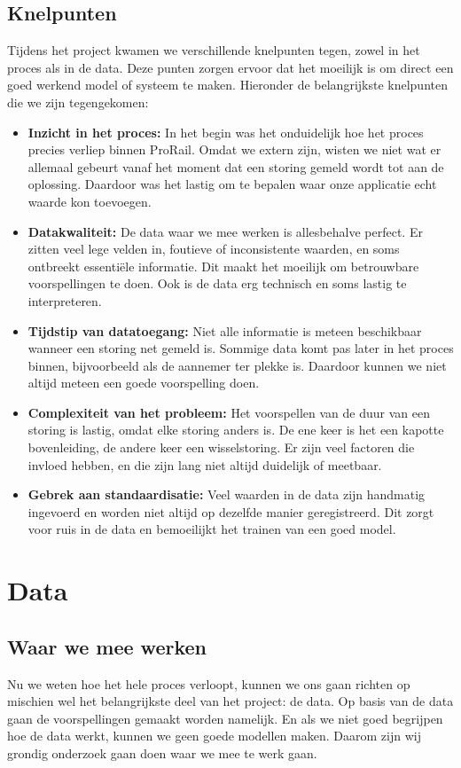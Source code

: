 \documentclass{article}
\begin{document}
\subsection{Knelpunten}
Tijdens het project kwamen we verschillende knelpunten tegen, zowel in het proces als in de data. Deze punten zorgen ervoor dat het moeilijk is om direct een goed werkend model of systeem te maken. Hieronder de belangrijkste knelpunten die we zijn tegengekomen:

\begin{itemize}
  \item \textbf{Inzicht in het proces:} In het begin was het onduidelijk hoe het proces precies verliep binnen ProRail. Omdat we extern zijn, wisten we niet wat er allemaal gebeurt vanaf het moment dat een storing gemeld wordt tot aan de oplossing. Daardoor was het lastig om te bepalen waar onze applicatie echt waarde kon toevoegen.
  \item \textbf{Datakwaliteit:} De data waar we mee werken is allesbehalve perfect. Er zitten veel lege velden in, foutieve of inconsistente waarden, en soms ontbreekt essentiële informatie. Dit maakt het moeilijk om betrouwbare voorspellingen te doen. Ook is de data erg technisch en soms lastig te interpreteren.
  \item \textbf{Tijdstip van datatoegang:} Niet alle informatie is meteen beschikbaar wanneer een storing net gemeld is. Sommige data komt pas later in het proces binnen, bijvoorbeeld als de aannemer ter plekke is. Daardoor kunnen we niet altijd meteen een goede voorspelling doen.
  \item \textbf{Complexiteit van het probleem:} Het voorspellen van de duur van een storing is lastig, omdat elke storing anders is. De ene keer is het een kapotte bovenleiding, de andere keer een wisselstoring. Er zijn veel factoren die invloed hebben, en die zijn lang niet altijd duidelijk of meetbaar.
  \item \textbf{Gebrek aan standaardisatie:} Veel waarden in de data zijn handmatig ingevoerd en worden niet altijd op dezelfde manier geregistreerd. Dit zorgt voor ruis in de data en bemoeilijkt het trainen van een goed model.
\end{itemize}

\newpage
\section{Data}

\subsection{Waar we mee werken}
Nu we weten hoe het hele proces verloopt, kunnen we ons gaan richten op mischien wel het belangrijkste deel van het project: de data. Op basis van de data gaan de voorspellingen gemaakt worden namelijk. En als we niet goed begrijpen hoe de data werkt, kunnen we geen goede modellen maken. Daarom zijn wij grondig onderzoek gaan doen waar we mee te werk gaan. 
\end{document}
